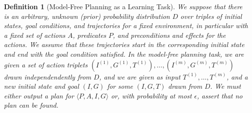 \documentclass[letterpaper]{article}
\newtheorem{definition}{Definition}
\begin{document}
\begin{definition}[Model-Free Planning as a Learning Task] We suppose that there is an arbitrary, unknown (prior) probability distribution $D$ over triples of initial states, goal conditions, and trajectories for a fixed environment, in particular with a fixed set of actions $A$, predicates $P$, and preconditions and effects for the actions. We assume that these trajectories start in the corresponding initial state and end with the goal condition satisfied. In the model-free planning task, we are given a set of action triplets $(I^{(1)},G^{(1)},T^{(1)}),\ldots,(I^{(m)},G^{(m)},T^{(m)})$ drawn independendently from $D$, and we are given as input $T^{(1)},\ldots,T^{(m)}$, and a new initial state and goal $(I,G)$ for some $(I,G,T)$ drawn from $D$. We must either output a plan for $\langle P,A,I,G\rangle$ or, with probability at most $\epsilon$, assert that no plan can be found.
\end{definition}

\end{document}
